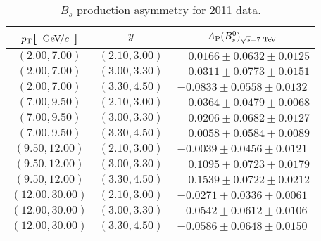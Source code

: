 \begin{table}[h]
\caption{$B_s$ production asymmetry for 2011 data.}
\centering
\begin{tabular}{c|c|c}
\mbox{$p_{\rm T}$}\xspace [ $ {\mathrm{\,Ge\kern -0.1em V\!/}c}$ \xspace] & $y$ & $A_{\rm P}( B\xspace\xspace^0_ s\xspace\xspace\xspace)_{\sqrt{s}\xspace = 7\, \mathrm{\,Te\kern -0.1em V}\xspace}$ \\
\hline
$(2.00,   7.00)$   &  $(2.10,  3.00)$  &  $  \phantom{-}0.0166  \pm  0.0632  \pm  0.0125  $     \\
$(2.00,   7.00)$   &  $(3.00,  3.30)$  &  $  \phantom{-}0.0311  \pm  0.0773  \pm  0.0151  $     \\
$(2.00,   7.00)$   &  $(3.30,  4.50)$  &  $  -0.0833            \pm  0.0558  \pm  0.0132  $            \\
$(7.00,   9.50)$   &  $(2.10,  3.00)$  &  $  \phantom{-}0.0364  \pm  0.0479  \pm  0.0068  $     \\
$(7.00,   9.50)$   &  $(3.00,  3.30)$  &  $  \phantom{-}0.0206  \pm  0.0682  \pm  0.0127  $    \\
$(7.00,   9.50)$   &  $(3.30,  4.50)$  &  $  \phantom{-}0.0058  \pm  0.0584  \pm  0.0089  $     \\
$(9.50,   12.00)$  &  $(2.10,  3.00)$  &  $  -0.0039            \pm  0.0456  \pm  0.0121  $           \\
$(9.50,   12.00)$  &  $(3.00,  3.30)$  &  $  \phantom{-}0.1095  \pm  0.0723  \pm  0.0179  $    \\
$(9.50,   12.00)$  &  $(3.30,  4.50)$  &  $  \phantom{-}0.1539  \pm  0.0722  \pm  0.0212  $   \\
$(12.00,  30.00)$  &  $(2.10,  3.00)$  &  $  -0.0271            \pm  0.0336  \pm  0.0061  $          \\
$(12.00,  30.00)$  &  $(3.00,  3.30)$  &  $  -0.0542            \pm  0.0612  \pm  0.0106  $         \\
$(12.00,  30.00)$  &  $(3.30,  4.50)$  &  $  -0.0586            \pm  0.0648  \pm  0.0150  $         \\
\end{tabular}
\end{table}